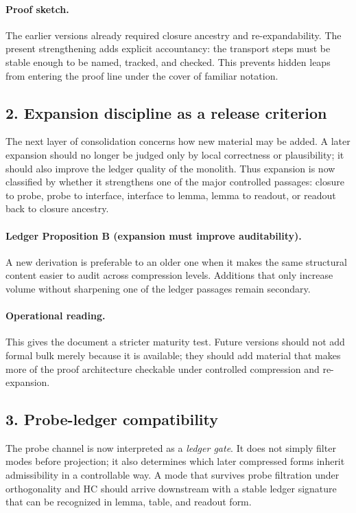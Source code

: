 \documentclass[12pt,a4paper]{article}
\begin{document}
\paragraph{Proof sketch.}
The earlier versions already required closure ancestry and re-expandability. The
present strengthening adds explicit accountancy: the transport steps must be
stable enough to be named, tracked, and checked. This prevents hidden leaps from
entering the proof line under the cover of familiar notation.

\subsection*{2. Expansion discipline as a release criterion}
The next layer of consolidation concerns how new material may be added. A later
expansion should no longer be judged only by local correctness or plausibility;
it should also improve the ledger quality of the monolith. Thus expansion is now
classified by whether it strengthens one of the major controlled passages:
closure to probe, probe to interface, interface to lemma, lemma to readout, or
readout back to closure ancestry.

\paragraph{Ledger Proposition B (expansion must improve auditability).}
A new derivation is preferable to an older one when it makes the same structural
content easier to audit across compression levels. Additions that only increase
volume without sharpening one of the ledger passages remain secondary.

\paragraph{Operational reading.}
This gives the document a stricter maturity test. Future versions should not add
formal bulk merely because it is available; they should add material that makes
more of the proof architecture checkable under controlled compression and
re-expansion.

\subsection*{3. Probe-ledger compatibility}
The probe channel is now interpreted as a \emph{ledger gate}. It does not simply
filter modes before projection; it also determines which later compressed forms
inherit admissibility in a controllable way. A mode that survives probe
filtration under orthogonality and HC should arrive downstream with a stable
ledger signature that can be recognized in lemma, table, and readout form.
\end{document}
